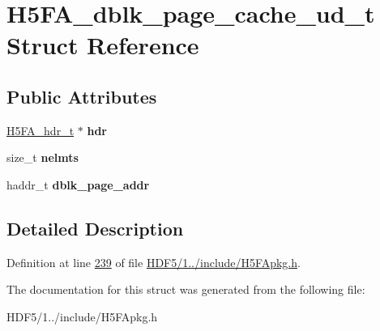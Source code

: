 \hypertarget{struct_h5_f_a__dblk__page__cache__ud__t}{}\section{H5\+F\+A\+\_\+dblk\+\_\+page\+\_\+cache\+\_\+ud\+\_\+t Struct Reference}
\label{struct_h5_f_a__dblk__page__cache__ud__t}
\subsection*{Public Attributes}
\begin{DoxyCompactItemize}
\item 
\mbox{\label{struct_h5_f_a__dblk__page__cache__ud__t_a740db70b079b29a142beae70925dfd58}} 
\hyperlink{struct_h5_f_a__hdr__t}{H5\+F\+A\+\_\+hdr\+\_\+t} $\ast$ {\bfseries hdr}
\item 
\mbox{\label{struct_h5_f_a__dblk__page__cache__ud__t_a552135069a1999414fba1dc9e665f84d}} 
size\+\_\+t {\bfseries nelmts}
\item 
\mbox{\label{struct_h5_f_a__dblk__page__cache__ud__t_a6bd1e61c4bd7d0d8cabb2a4c91970f07}} 
haddr\+\_\+t {\bfseries dblk\+\_\+page\+\_\+addr}
\end{DoxyCompactItemize}


\subsection{Detailed Description}


Definition at line \hyperlink{_h_d_f5_21_810_81_2include_2_h5_f_apkg_8h_source_l00239}{239} of file \hyperlink{_h_d_f5_21_810_81_2include_2_h5_f_apkg_8h_source}{H\+D\+F5/1../include/\+H5\+F\+Apkg.\+h}.



The documentation for this struct was generated from the following file\+:\begin{DoxyCompactItemize}
\item 
H\+D\+F5/1../include/\+H5\+F\+Apkg.\+h\end{DoxyCompactItemize}

